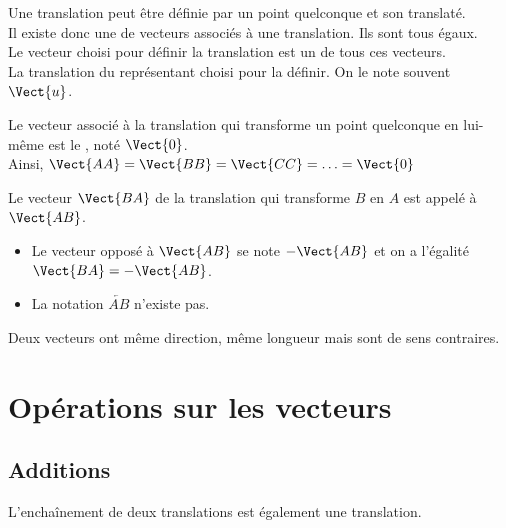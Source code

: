 \documentclass{book}
\begin{document}
\begin{Remarque}
Une translation peut être définie par un point quelconque et son translaté.\\
Il existe donc une   de vecteurs associés à une translation. Ils sont tous égaux.  \\
Le vecteur choisi pour définir la translation est un  de tous ces vecteurs. \\
La translation   du représentant choisi pour la définir. On le note souvent $\Vect{u}$.
\end{Remarque}

\begin{Definition}
Le vecteur associé à la translation qui transforme un point quelconque en lui-même est le , noté $\Vect{0}$.\\ Ainsi, 
$\Vect{AA} = \Vect{BB}  = \Vect{CC}= \ldots =\Vect{0} $ 
\end{Definition}

\begin{Definition}
Le vecteur $\Vect{BA}$ de la translation qui transforme $B$ en $A$ est appelé  à $\Vect{AB}$. 
\end{Definition}
\begin{Remarque}
\begin{itemize}
\item Le vecteur opposé à $\Vect{AB}$ se note $-\Vect{AB}$ et on a l'égalité $\Vect{BA}=-\Vect{AB}$.
\item La notation $\overleftarrow{AB}$ n'existe pas.
\end{itemize}
\end{Remarque}

\begin{Remarque}Deux vecteurs   ont même direction, même longueur mais sont de sens contraires.
\end{Remarque}

\section{Opérations sur les vecteurs}

\subsection{Additions}

\begin{Propriete}
 L'enchaînement de deux translations est également une translation.
\end{Propriete}
\end{document}
